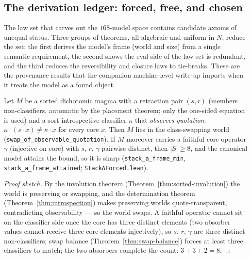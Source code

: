 \documentclass[sigconf,screen]{acmart}
\newcommand{\dotop}{\cdot}
\theoremstyle{remark}
\begin{document}
\subsection{The derivation ledger: forced, free, and chosen}
\label{sec:ledger}

The law set that carves out the $168$-model space contains candidate
axioms of unequal status. Three groups of theorems, all algebraic and
uniform in $N$, reduce the set: the first derives the model's frame
(world and size) from a single semantic requirement, the second shows
the eval side of the law set is redundant, and the third reduces the
reversibility and closure laws to tie-breaks. These are the provenance
results that the companion machine-level write-up imports when it
treats the model as a found object.

\begin{theorem}
\label{thm:frame-forced}
Let $M$ be a sorted dichotomic magma with a retraction pair
$(s, r)$ (members non-classifiers, automatic by the placement theorem;
only the one-sided equation is used) and a sort-introspective
classifier $\kappa$ that
\emph{observes quotation}: $\kappa \dotop (s \dotop x) \neq \kappa
\dotop x$ for every core $x$. Then $M$ lies in the class-swapping
world (\texttt{swap\_of\_observable\_quotation}). If $M$ moreover
carries a faithful core operator $\gamma$ (injective on core) with
$s$, $r$, $\gamma$ pairwise distinct, then $|S| \geq 8$, and the
canonical model attains the bound, so it is sharp
(\texttt{stack\_a\_frame\_min}, \texttt{stack\_a\_frame\_attained};
\texttt{StackAForced.lean}).
\end{theorem}

\begin{proof}[Proof sketch]
By the involution theorem (Theorem~\ref{thm:sorted-involution}) the
world is preserving or swapping, and the determination theorem
(Theorem~\ref{thm:introspection}) makes preserving worlds
quote-transparent, contradicting observability --- so the world swaps.
A faithful operator cannot sit on the classifier side once the core has
three distinct elements (two absorber values cannot receive three core
elements injectively), so $s$, $r$, $\gamma$ are three distinct
non-classifiers; swap balance (Theorem~\ref{thm:swap-balance}) forces
at least three classifiers to match; the two absorbers complete the
count: $3 + 3 + 2 = 8$.
\end{proof}
\end{document}
